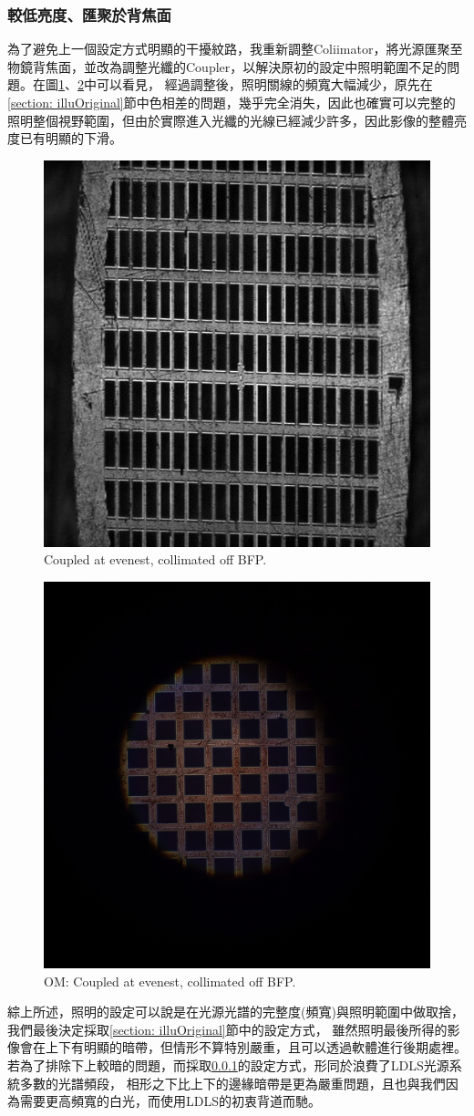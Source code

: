 \documentclass[12pt]{article}
\begin{document}
    \subsubsection{較低亮度、匯聚於背焦面} \label{illuDark}
    為了避免上一個設定方式明顯的干擾紋路，我重新調整Coliimator，將光源匯聚至物鏡背焦面，並改為調整光纖的Coupler，以解決原初的設定中照明範圍不足的問題。在圖\ref{figure: evenest_on}、\ref{figure: om_evenest_on}中可以看見，
    經過調整後，照明關線的頻寬大幅減少，原先在\ref{section: illuOriginal}節中色相差的問題，幾乎完全消失，因此也確實可以完整的照明整個視野範圍，但由於實際進入光纖的光線已經減少許多，因此影像的整體亮度已有明顯的下滑。
    \begin{figure}
        \centering
        \includegraphics[width=0.5\linewidth]{on_evenest.jpg}
        \caption{Coupled at evenest, collimated off BFP.}
        \label{figure: evenest_on}
    \end{figure}
    \begin{figure}
        \centering
        \includegraphics[width=0.5\linewidth]{om_on_evenest.JPG}
        \caption{OM: Coupled at evenest, collimated off BFP.}
        \label{figure: om_evenest_on}
    \end{figure}
    \newline \newline \noindent 綜上所述，照明的設定可以說是在光源光譜的完整度(頻寬)與照明範圍中做取捨，我們最後決定採取\ref{section: illuOriginal}節中的設定方式，
    雖然照明最後所得的影像會在上下有明顯的暗帶，但情形不算特別嚴重，且可以透過軟體進行後期處裡。若為了排除下上較暗的問題，而採取\ref{illuDark}的設定方式，形同於浪費了LDLS光源系統多數的光譜頻段，
    相形之下比上下的邊緣暗帶是更為嚴重問題，且也與我們因為需要更高頻寬的白光，而使用LDLS的初衷背道而馳。
\end{document}
